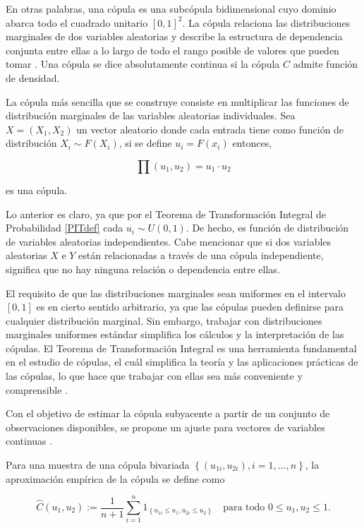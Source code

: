 En otras palabras, una cópula es una subcópula bidimensional cuyo dominio abarca todo el cuadrado unitario $[0, 1]^2$. La cópula relaciona las distribuciones marginales de dos variables aleatorias y describe la estructura de dependencia conjunta entre ellas a lo largo de todo el rango posible de valores que pueden tomar \cite{nelsenintroduction}. Una cópula se dice absolutamente continua si la cópula $C$ admite función de densidad.

\begin{ejemplo}
    La cópula más sencilla que se construye consiste en multiplicar las funciones de distribución marginales de las variables aleatorias individuales. Sea $X = (X_1, X_2)$ un vector aleatorio donde cada entrada tiene como función de distribución $X_i \sim F(X_i)$, si se define $u_i = F(x_i)$ entonces,

    \begin{equation}
         \prod (u_1, u_2) = u_1 \cdot u_2
    \end{equation}

    es una cópula.

    Lo anterior es claro, ya que por el Teorema de Transformación Integral de Probabilidad \ref{PITdef} cada $u_i \sim U(0, 1)$. De hecho, es función de distribución de variables aleatorias independientes. Cabe mencionar que si dos variables aleatorias $X$ e $Y$ están relacionadas a través de una cópula independiente, significa que no hay ninguna relación o dependencia entre ellas.
\end{ejemplo}

El requisito de que las distribuciones marginales sean uniformes en el intervalo $[0,1]$ es en cierto sentido arbitrario, ya que las cópulas pueden definirse para cualquier distribución marginal. Sin embargo, trabajar con distribuciones marginales uniformes estándar simplifica los cálculos y la interpretación de las cópulas. El Teorema de Transformación Integral es una herramienta fundamental en el estudio de cópulas, el cuál simplifica la teoría y las aplicaciones prácticas de las cópulas, lo que hace que trabajar con ellas sea más conveniente y comprensible \cite{CopulasR}.

Con el objetivo de estimar la cópula subyacente a partir de un conjunto de observaciones disponibles, se propone un ajuste para vectores de variables continuas \cite{CopulasR}.

\begin{defn}
    Para una muestra de una cópula bivariada $\left\{ (u_{1 i}, u_{2 i}), i=1, \ldots, n\right\}$, la aproximación empírica de la cópula se define como

    \begin{equation}
        \hat{C}\left(u_1, u_2\right):=\frac{1}{n+1} \sum_{i=1}^n 1_{\left\{u_{1 i} \leq u_1, u_{2 i} \leq u_2\right\}} \quad \text {para todo } 0 \leq u_1, u_2 \leq 1.
    \end{equation}
\end{defn}

